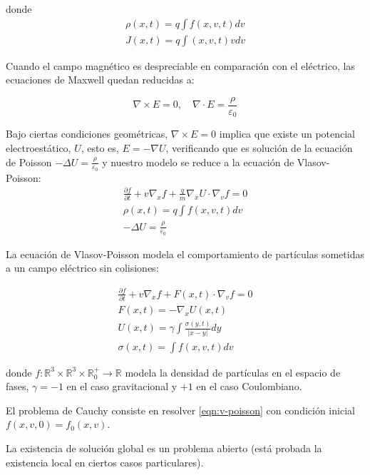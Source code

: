 \documentclass[a4paper,10pt]{scrartcl}
\theoremstyle{definition}
\numberwithin{equation}{section}
\begin{document}
donde 
\begin{align*}
\rho(x,t) = q \int f(x,v,t) dv\\
J(x,t) = q \int (x,v,t) v dv
\end{align*}

Cuando el campo magnético es despreciable en comparación con el eléctrico, las ecuaciones de Maxwell quedan reducidas a:

\begin{equation*}
 \nabla \times E = 0, \quad \nabla \cdot E = \frac{\rho}{\varepsilon_0}
\end{equation*}

Bajo ciertas condiciones geométricas, $\nabla \times E = 0$ implica que existe un potencial electroestático, $U$, esto es, $E = - \nabla U$, verificando que es solución de la ecuación de Poisson $-\Delta U = \frac{\rho}{\varepsilon_0}$ y nuestro modelo se reduce a la ecuación de Vlasov-Poisson:
\begin{align}
 \frac{\partial f}{\partial t} + v \nabla_x f + \frac{q}{m}\nabla_x U \cdot \nabla_v f = 0\\
 \rho(x,t) = q \int f(x,v,t) dv \nonumber\\
 -\Delta U = \frac{\rho}{\varepsilon_0} \nonumber
\end{align}


La ecuación de Vlasov-Poisson modela el comportamiento de partículas sometidas a un campo eléctrico sin colisiones:

\begin{align}
\label{eqn:v-poisson}
 \frac{\partial f}{\partial t} + v \nabla_x f + F(x,t) \cdot \nabla_v f = 0\\
 F(x,t) = - \nabla_x U(x,t) \nonumber \\ 
 U(x,t) = \gamma \int \frac{\sigma(y,t)}{|x-y|} dy \nonumber \\
 \sigma(x,t) = \int f(x,v,t) dv \nonumber
\end{align}

donde $f:\mathbb{R}^3 \times \mathbb{R}^3 \times \mathbb{R}^{+}_0 \rightarrow \mathbb{R}$ modela la densidad de partículas en el espacio de fases, $\gamma = -1$ en el caso gravitacional y $+1$ en el caso Coulombiano.

El problema de Cauchy consiste en resolver \eqref{eqn:v-poisson} con condición inicial $f(x,v,0) = f_0(x,v)$.

La existencia de solución global es un problema abierto (está probada la existencia local en ciertos casos particulares).
\end{document}
